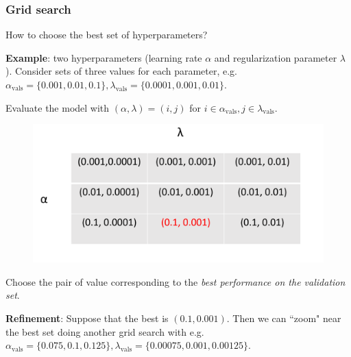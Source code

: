 \documentclass{beamer}
\begin{document}
	\begin{frame}
		\frametitle{Grid search}
		
		How to choose the best set of hyperparameters?
		
		\vspace{2mm}
		
		\textbf{Example}: two hyperparameters (learning rate $\alpha$ and regularization parameter $\lambda$). Consider sets of three values for each parameter, e.g. $\alpha_{\text{vals}} = \{0.001, 0.01, 0.1\}, \lambda_{\text{vals}} = \{0.0001, 0.001, 0.01\}$. 
		
		Evaluate the model with $(\alpha, \lambda) = (i,j)$ for $i \in \alpha_{\text{vals}}, j \in \lambda_{\text{vals}}$.
		
		\begin{figure}
			\centering
			\includegraphics[scale=0.4]{images/grid-search}
		\end{figure}
		Choose the pair of value corresponding to the \textit{best performance on the validation set}.
		
		\vspace{2mm}
		
		\textbf{Refinement}: Suppose that the best is $(0.1, 0.001)$. Then we can ``zoom" near the best set doing another grid search with e.g. $\alpha_{\text{vals}} = \{0.075, 0.1, 0.125\}, \lambda_{\text{vals}} = \{0.00075, 0.001, 0.00125\}$. 
		
	\end{frame}
	

	
\end{document}
